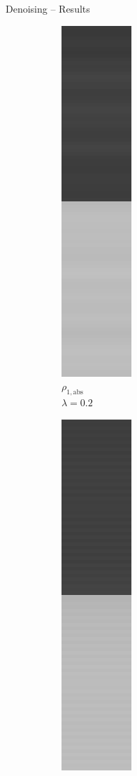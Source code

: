 \documentclass[t]{beamer}
\begin{document}
\begin{frame}{Denoising -- Results}
\begin{figure}[t]
\begin{subfigure}[t]{0.08\textwidth}
			\end{subfigure}
			\begin{subfigure}[t]{0.08\textwidth}
				\includegraphics[scale=0.25]{../paper/pictures/denoising/signal/ipiano_absolute_02.png}\\
				\tiny $\rho_{1,\text{abs}}$\\[2px]
				\tiny $\lambda = 0.2$
			\end{subfigure}
			\begin{subfigure}[t]{0.08\textwidth}
				\includegraphics[scale=0.25]{../paper/pictures/denoising/signal/ipiano_squared_02.png}\\

\end{subfigure}
\end{figure}
\end{frame}
\end{document}
